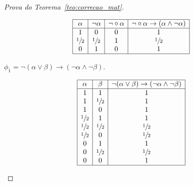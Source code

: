 \begin{proof}[Prova do Teorema~\ref{teo:correcao_mat}]
\begin{provaporcasos}
\begin{provaporsubcasos}
                \begin{center}
                    \[
                        \begin{array}{|c|c|c|c|}%
                            \hline
                            \alpha      & \neg \alpha & \neg \circ \alpha & \neg \circ \alpha \to (\alpha \land \neg \alpha)\\
                            \hline%
                            1 & 0 & 0 &1\\
                            \meio{} & \meio{} & 1&\meio{}\\
                            0 & 1 & 0&1\\
                            \hline
                        \end{array}
                    \]
                \end{center}
               

                \subcasodeprova{} $\phi_{1} = \neg (\alpha \lor \beta) \to (\neg \alpha \land \neg \beta)$. 

                \begin{center}
                    \[
                        \begin{array}{|c|c|c|}%
                            \hline
                            \alpha      & \beta & \neg (\alpha \lor \beta) \to (\neg \alpha \land \neg \beta) \\
                            \hline%
                            1 & 1 & 1\\
                            1 & \meio{} & 1\\
                            1 & 0 & 1\\
                            \meio{} & 1 & 1\\
                            \meio{} & \meio{} &\meio{}\\ 
                            \meio{} & 0 & \meio{}\\
                            0 & 1 & 1\\
                            0 & \meio{} & \meio{}\\
                            0 & 0 & 1\\
                            \hline
                        \end{array}
                    \]
                \end{center}
                

\end{provaporsubcasos}
\end{provaporcasos}
\end{proof}
